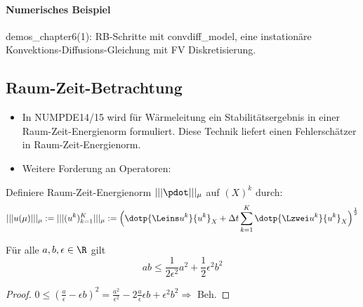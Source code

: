 \paragraph*{Numerisches Beispiel} demos\_chapter6(1): RB-Schritte mit convdiff\_model, eine instationäre Konvektions-Diffusions-Gleichung mit FV Diskretisierung.

\subsection{Raum-Zeit-Betrachtung}

\begin{itemize}
	\item In NUMPDE14/15 wird für Wärmeleitung ein Stabilitätsergebnis in einer Raum-Zeit-Energienorm formuliert. Diese Technik liefert einen Fehlerschätzer in Raum-Zeit-Energienorm.
	\item Weitere Forderung an Operatoren:
\end{itemize}

\begin{defn}
Definiere Raum-Zeit-Energienorm $|||\pdot|||_{\mu}$ auf $(X)^k$ durch:
\[
|||u(\mu)|||_{\mu} := |||(u^k)_{k=1}^K|||_{\mu} := \Big(\dotp{\Leins u^k}{u^k}_X + \Delta t \sum\limits_{k=1}^K \dotp{\Lzwei u^k}{u^k}_X \Big)^{\frac{1}{2}}
\]
\end{defn}

\begin{lemma}
Für alle $a, b, \epsilon \in \R$ gilt
\[
	a b \leq \frac{1}{2 \epsilon^2} a^2 + \frac{1}{2} \epsilon^2 b^2
\]
\begin{proof}
	$ 0 \leq (\frac{a}{\epsilon}- \epsilon b)^2 = \frac{a^2}{\epsilon^2} - 2 \frac{a}{\epsilon} \epsilon b + \epsilon^2 b^2 \Rightarrow$ Beh.
\end{proof}
\end{lemma}

